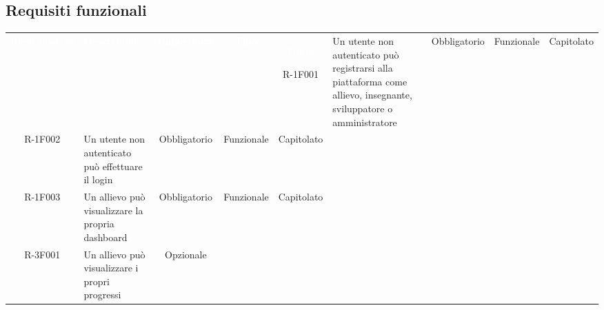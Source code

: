 \subsection{Requisiti funzionali} 
\renewcommand{\arraystretch}{1.5}
\def\tabularxcolumn#1{m{#1}}
\begin{tabularx}{\textwidth}{cXccc}
 
   \textcolor{white}{\textbf{Identificativo}} &
   \textcolor{white}{\textbf{Descrizione}}&
   \textcolor{white}{\textbf{Importanza}}&
   \textcolor{white}{\textbf{Tipo}}&
   \textcolor{white}{\textbf{Fonte}}\endhead
 
R-1F001 &
 
Un utente non autenticato può registrarsi alla piattaforma come allievo, insegnante, sviluppatore o amministratore &
 
Obbligatorio &
 
Funzionale &
 
Capitolato \\

R-1F002 &

Un utente non autenticato può effettuare il login &

Obbligatorio &

Funzionale &

Capitolato \\
R-1F003 &

Un allievo può visualizzare la propria dashboard &

Obbligatorio &

Funzionale &

Capitolato \\
R-3F001 &


Un allievo può visualizzare i propri progressi &

Opzionale &


\end{tabularx}

